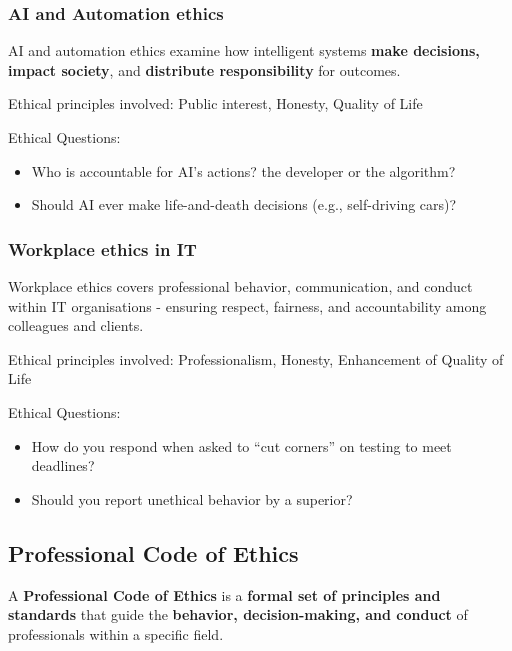 \subsubsection{AI and Automation ethics}

\indent 

AI and automation ethics examine how intelligent systems \textbf{make decisions, impact society}, and \textbf{distribute responsibility} for outcomes.

Ethical principles involved: Public interest, Honesty, Quality of Life

Ethical Questions:

\begin{itemize}
    \item Who is accountable for AI’s actions? the developer or the algorithm?
    \item Should AI ever make life-and-death decisions (e.g., self-driving cars)?
\end{itemize}

\subsubsection{Workplace ethics in IT}

Workplace ethics covers professional behavior, communication, and conduct within IT organisations - ensuring respect, fairness, and accountability among colleagues and clients.

Ethical principles involved: Professionalism, Honesty, Enhancement of Quality of Life

Ethical Questions:

\begin{itemize}
    \item How do you respond when asked to “cut corners” on testing to meet deadlines?
    \item Should you report unethical behavior by a superior?
\end{itemize}

\subsection{Professional Code of Ethics}

\indent 

A \textbf{Professional Code of Ethics} is a \textbf{formal set of principles and standards} that guide the \textbf{behavior, decision-making, and conduct} of professionals within a specific field.

